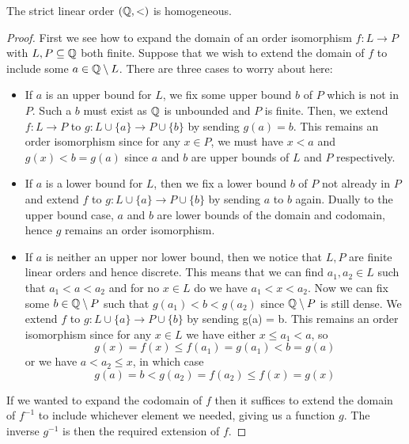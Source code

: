 \begin{prop}
  The strict linear order $(\mathbb{Q},<)$ is homogeneous.
\end{prop}
\begin{proof}
  First we see how to expand the
  domain of an order isomorphism $f : L \to P$ with $L, P \subseteq \mathbb{Q}$ both finite. Suppose that we
  wish to extend the domain of $f$ to include some $a \in \mathbb{Q} \setminus L$. There are three cases to
  worry about here:
  \begin{itemize}
    \item If $a$ is an upper bound for $L$, we fix some upper bound $b$ of $P$ which is
      not in $P$. Such a $b$ must exist as $\mathbb{Q}$ is unbounded and $P$ is finite. Then, we extend
      $f : L \to P$ to $g : L \cup \{a\} \to P \cup \{b\}$ by sending $g(a) = b$. This remains an
      order isomorphism since for any $x \in P$, we must have $x < a$ and $g(x) < b = g(a)$ since
      $a$ and $b$ are upper bounds of $L$ and $P$ respectively.
    \item If $a$ is a lower bound for $L$, then we fix a lower bound $b$ of $P$ not already in
      $P$ and extend $f$ to $g : L \cup \{a\} \to P \cup \{b\}$ by sending $a$ to $b$ again.
      Dually to the upper bound case, $a$ and $b$ are lower bounds of the domain and
      codomain, hence $g$ remains an order isomorphism.
    \item If $a$ is neither an upper nor lower bound, then we notice that $L,P$ are finite linear
      orders and hence discrete.
      This means that we can find $a_1,a_2 \in L$ such that $a_1 < a < a_2$ and for no $x \in L$ do
      we have $a_1 < x < a_2$. Now we can fix some $b \in \mathbb{Q} \setminus P$ such that
      $g(a_1) < b < g(a_2)$ since $\mathbb{Q} \setminus P$ is still dense. We extend $f$ to
      $g : L \cup \{a\} \to P \cup \{b\}$ by sending g(a) = b. This remains an order isomorphism
      since for any $x \in L$ we have either $x \leq a_1 < a$, so
      \begin{equation*}
        g(x) = f(x) \leq f(a_1) = g(a_1) < b = g(a)
      \end{equation*}
      or we have $a < a_2 \leq x$, in which case
      \begin{equation*}
        g(a) = b < g(a_2) = f(a_2) \leq f(x) = g(x)
      \end{equation*}
  \end{itemize}
  If we wanted to expand the codomain of $f$ then it suffices to extend the domain of 
  $f^{-1}$ to include whichever
  element we needed, giving us a function $g$. The inverse $g^{-1}$ is then the required extension
  of $f$.


\end{proof}
